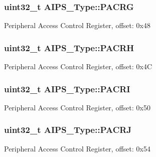 \subsubsection[{\texorpdfstring{P\+A\+C\+RG}{PACRG}}]{ uint32\+\_\+t A\+I\+P\+S\+\_\+\+Type\+::\+P\+A\+C\+RG}\hypertarget{structAIPS__Type_a06a568198bd9ec01495df5d5a9ecc2c5}{}\label{structAIPS__Type_a06a568198bd9ec01495df5d5a9ecc2c5}
Peripheral Access Control Register, offset\+: 0x48 
\subsubsection[{\texorpdfstring{P\+A\+C\+RH}{PACRH}}]{ uint32\+\_\+t A\+I\+P\+S\+\_\+\+Type\+::\+P\+A\+C\+RH}\hypertarget{structAIPS__Type_a932a66c872893772bf884aece2867126}{}\label{structAIPS__Type_a932a66c872893772bf884aece2867126}
Peripheral Access Control Register, offset\+: 0x4C 
\subsubsection[{\texorpdfstring{P\+A\+C\+RI}{PACRI}}]{ uint32\+\_\+t A\+I\+P\+S\+\_\+\+Type\+::\+P\+A\+C\+RI}\hypertarget{structAIPS__Type_a09b41fa8373356bab7e32e66d9772e3d}{}\label{structAIPS__Type_a09b41fa8373356bab7e32e66d9772e3d}
Peripheral Access Control Register, offset\+: 0x50 
\subsubsection[{\texorpdfstring{P\+A\+C\+RJ}{PACRJ}}]{ uint32\+\_\+t A\+I\+P\+S\+\_\+\+Type\+::\+P\+A\+C\+RJ}\hypertarget{structAIPS__Type_a177b71722ac449eb724387d15e9c9536}{}\label{structAIPS__Type_a177b71722ac449eb724387d15e9c9536}
Peripheral Access Control Register, offset\+: 0x54 

